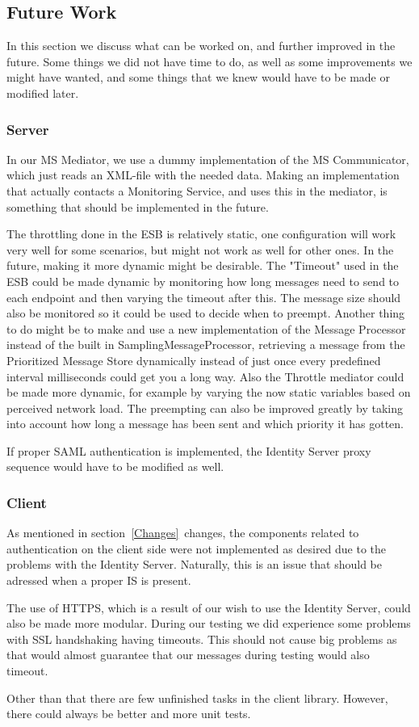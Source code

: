 \subsection{Future Work}\label{Future Work}
    In this section we discuss what can be worked on, and further improved in the future. Some things we did not have time to do, as well as some improvements we might have wanted, and some things that we knew would have to be made or modified later.

    \subsubsection{Server}\label{Future:Server}
        In our MS Mediator, we use a dummy implementation of the MS Communicator, which just reads an XML-file with the needed data. Making an implementation that actually contacts a Monitoring Service, and uses this in the mediator, is something that should be implemented in the future.

        The throttling done in the ESB is relatively static, one configuration will work very well for some scenarios, but might not work as well for other ones. In the future, making it more dynamic might be desirable. The "Timeout" used in the ESB could be made dynamic by monitoring how long messages need to send to each endpoint and then varying the timeout after this. The message size should also be monitored so it could be used to decide when to preempt. Another thing to do might be to make and use a new implementation of the Message Processor instead of the built in SamplingMessageProcessor, retrieving a message from the Prioritized Message Store dynamically instead of just once every predefined interval milliseconds could get you a long way. Also the Throttle mediator could be made more dynamic, for example by varying the now static variables based on perceived network load. The preempting can also be improved greatly by taking into account how long a message has been sent and which priority it has gotten.

        If proper SAML authentication is implemented, the Identity Server proxy sequence would have to be modified as well.

	\subsubsection{Client}\label{Future:Client}
		As mentioned in section~\ref{Changes}~changes, the components related to authentication on the client side were not implemented as desired due to the problems with the Identity Server. Naturally, this is an issue that should be adressed when a proper IS is present.

		The use of HTTPS, which is a result of our wish to use the Identity Server, could also be made more modular. During our testing we did experience some problems with SSL handshaking having timeouts. This should not cause big problems as that would almost guarantee that our messages during testing would also timeout.
		
    	Other than that there are few unfinished tasks in the client library. However, there could always be better and more unit tests. 

